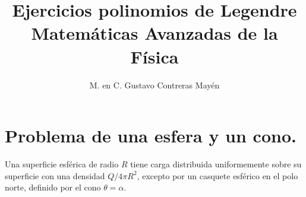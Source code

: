 
\title{Ejercicios polinomios de Legendre \\[0.3em]  \large{Matemáticas Avanzadas de la Física}\vspace{-3ex}}
\author{M. en C. Gustavo Contreras Mayén}

\vspace{-4cm}
\maketitle
\fontsize{14}{14}\selectfont

\section{Problema de una esfera y un cono.}

Una superficie esférica de radio $R$ tiene carga distribuida uniformemente sobre su superficie con una densidad $Q / 4 \pi R^{2}$, excepto por un casquete esférico en el polo norte, definido por el cono $\theta = \alpha$.

